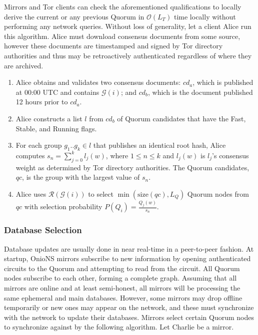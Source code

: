 \documentclass[USenglish,oneside,twocolumn]{article}
\begin{document}
Mirrors and Tor clients can check the aforementioned qualifications to locally derive the current or any previous Quorum in $ \mathcal{O}(L_{T}) $ time locally without performing any network queries. Without loss of generality, let a client Alice run this algorithm. Alice must download consensus documents from some source, however these documents are timestamped and signed by Tor directory authorities and thus may be retroactively authenticated regardless of where they are archived.

\begin{enumerate}
	\item Alice obtains and validates two consensus documents: $ \mathit{cd}_{a} $, which is published at 00:00 UTC and contains $ \mathcal{G}(i) $; and $ \mathit{cd}_{b} $, which is the document published 12 hours prior to $ \mathit{cd}_{a} $. 
	\item Alice constructs a list $ l $ from $ \mathit{cd}_{b} $ of Quorum candidates that have the Fast, Stable, and Running flags.
	\item For each group $ g_{1} .. g_{k} \in l $ that publishes an identical root hash, Alice computes $ s_{n} = \sum_{j=0}^{k} l_{j}(w) $, where $ 1 \leq n \leq k $ and $ l_{j}(w) $ is $ l_{j} $'s consensus weight as determined by Tor directory authorities. The Quorum candidates, $ \mathit{qc} $, is the group with the largest value of $ s_{n} $.
	\item Alice uses $ \mathcal{R}(\mathcal{G}(i)) $ to select $ \min(\mathrm{size}(\mathit{qc}), L_{Q}) $ Quorum nodes from $ \mathit{qc} $ with selection probability $ P(Q_{i}) = \frac{Q_{j}(w)}{s_{n}} $.
\end{enumerate}

\subsubsection{Database Selection}


Database updates are usually done in near real-time in a peer-to-peer fashion. At startup, OnioNS mirrors subscribe to new information by opening authenticated circuits to the Quorum and attempting to read from the circuit. All Quorum nodes subscribe to each other, forming a complete graph. Assuming that all mirrors are online and at least semi-honest, all mirrors will be processing the same ephemeral and main databases. However, some mirrors may drop offline temporarily or new ones may appear on the network, and these must synchronize with the network to update their databases. Mirrors select certain Quorum nodes to synchronize against by the following algorithm. Let Charlie be a mirror.
\end{document}
